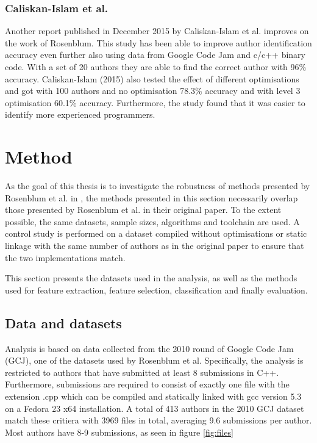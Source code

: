 \documentclass[a4paper,11pt]{kth-mag}
\begin{document}
\subsection{Caliskan-Islam et al.}
Another report published in December 2015 by Caliskan-Islam et al. improves on
the work of Rosenblum. This study has been able to improve author
identification accuracy even further also using data from Google Code Jam and
c/c++ binary code. With a set of 20 authors they are able to find the correct
author with 96\% accuracy. Caliskan-Islam (2015) also tested the effect of
different optimisations and got with 100 authors and no optimisation 78.3\%
accuracy and with level 3 optimisation 60.1\% accuracy. Furthermore, the study
found that it was easier to identify more experienced programmers.

\chapter{Method} \label{ch:method}
As the goal of this thesis is to investigate the robustness of methods
presented by Rosenblum et al. in \parencite{rosenblum2011wrote}, the methods
presented in this section necessarily overlap those presented by Rosenblum et
al. in their original paper. To the extent possible, the same datasets, sample
sizes, algorithms and toolchain are used. A control study is performed on a
dataset compiled without optimisations or static linkage with the same number
of authors as in the original paper to ensure that the two implementations
match. 

This section presents the datasets used in the analysis, as well as the methods
used for feature extraction, feature selection, classification and finally
evaluation.

\section{Data and datasets} \label{data-datasets}
Analysis is based on data collected from the 2010 round of Google Code Jam
(GCJ), one of the datasets used by Rosenblum et al. Specifically, the analysis
is restricted to authors that have submitted at least 8 submissions in C++.
Furthermore, submissions are required to consist of exactly one file with the
extension .cpp which can be compiled and statically linked with gcc version 5.3
on a Fedora 23 x64 installation. A total of 413 authors in the 2010 GCJ dataset
match these critiera with 3969 files in total, averaging 9.6 submissions per
author. Most authors have 8-9 submissions, as seen in figure \ref{fig:files} 
\end{document}
